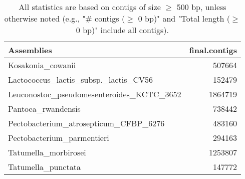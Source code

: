 \documentclass[12pt,a4paper]{article}
\begin{document}
\begin{table}[ht]
\begin{center}
\caption{All statistics are based on contigs of size $\geq$ 500 bp, unless otherwise noted (e.g., "\# contigs ($\geq$ 0 bp)" and "Total length ($\geq$ 0 bp)" include all contigs).}
\begin{tabular}{|l*{1}{|r}|}
\hline
Assemblies & final.contigs \\ \hline
Kosakonia\_cowanii & 507664 \\ \hline
Lactococcus\_lactis\_subsp.\_lactis\_CV56 & 152479 \\ \hline
Leuconostoc\_pseudomesenteroides\_KCTC\_3652 & 1864719 \\ \hline
Pantoea\_rwandensis & 738442 \\ \hline
Pectobacterium\_atrosepticum\_CFBP\_6276 & 483160 \\ \hline
Pectobacterium\_parmentieri & 294163 \\ \hline
Tatumella\_morbirosei & 1253807 \\ \hline
Tatumella\_punctata & 147772 \\ \hline
\end{tabular}
\end{center}
\end{table}
\end{document}
